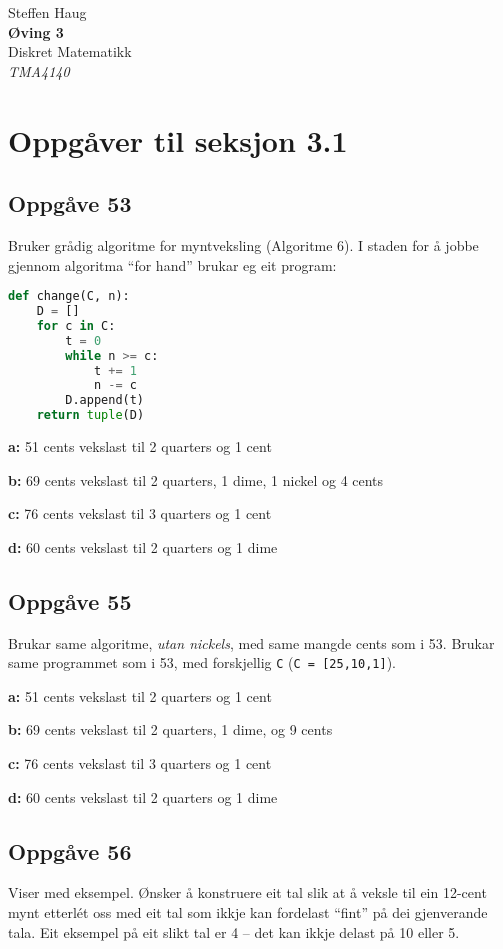 \documentclass[a4paper, 11pt]{article}
\newcommand{\tittel}{Øving 3}
\newcommand{\fag}{Diskret Matematikk}
\newcommand{\fagkode}{TMA4140}
\newcommand{\forfatter}{Steffen Haug}
\newcommand{\deloppg}[1]{\vspace{1mm}\noindent \textbf{\themecolor{#1:}}}
\newcommand{\themeshade}{Mahogany}
\newcommand{\themecolor}[1]{\textcolor{\themeshade}{#1}}
\newcommand*{\titleTH}{\begingroup 
    \raggedleft
    \vspace*{\baselineskip}
    {\Large \forfatter}\\[0.167\textheight]
    {\LARGE\bfseries \tittel}\\[\baselineskip]
    {\themecolor{\Huge \fag}}\\[\baselineskip]
    {\Large \textit{\fagkode}}\par
    \vfill
\endgroup}
\begin{document}
\pagestyle{empty}
\titleTH
\newpage

\lstdefinestyle{themecode}{
    keywordstyle=\themecolor,
}

\lstset{numbers=left, basicstyle=\ttfamily, style=themecode}


\section{Oppgåver til seksjon 3.1}

\subsection*{Oppgåve 53}
Bruker grådig algoritme for myntveksling (Algoritme 6). I staden for å jobbe gjennom
algoritma ``for hand'' brukar eg eit program:

\begin{lstlisting}[language=Python]
def change(C, n):
    D = []
    for c in C:
        t = 0
        while n >= c:
            t += 1
            n -= c
        D.append(t)
    return tuple(D)
\end{lstlisting}

\deloppg{a} 51 cents vekslast til 2 quarters og 1 cent

\deloppg{b} 69 cents vekslast til 2 quarters, 1 dime, 1 nickel og 4 cents

\deloppg{c} 76 cents vekslast til 3 quarters og 1 cent

\deloppg{d} 60 cents vekslast til 2 quarters og 1 dime

\subsection*{Oppgåve 55}
Brukar same algoritme, {\em utan nickels}, med same mangde cents som i \themecolor{53}.
Brukar same programmet som i \themecolor{53}, med forskjellig {\tt C} 
({\tt C = [25,10,1]}).

\deloppg{a} 51 cents vekslast til 2 quarters og 1 cent

\deloppg{b} 69 cents vekslast til 2 quarters, 1 dime, og 9 cents

\deloppg{c} 76 cents vekslast til 3 quarters og 1 cent

\deloppg{d} 60 cents vekslast til 2 quarters og 1 dime

\subsection*{Oppgåve 56}
Viser med eksempel. Ønsker å konstruere eit tal slik at å veksle til ein 12-cent mynt
etterlét oss med eit tal som ikkje kan fordelast ``fint'' på dei gjenverande tala.
Eit eksempel på eit slikt tal er 4 -- det kan ikkje delast på 10 eller 5. 
\end{document}
